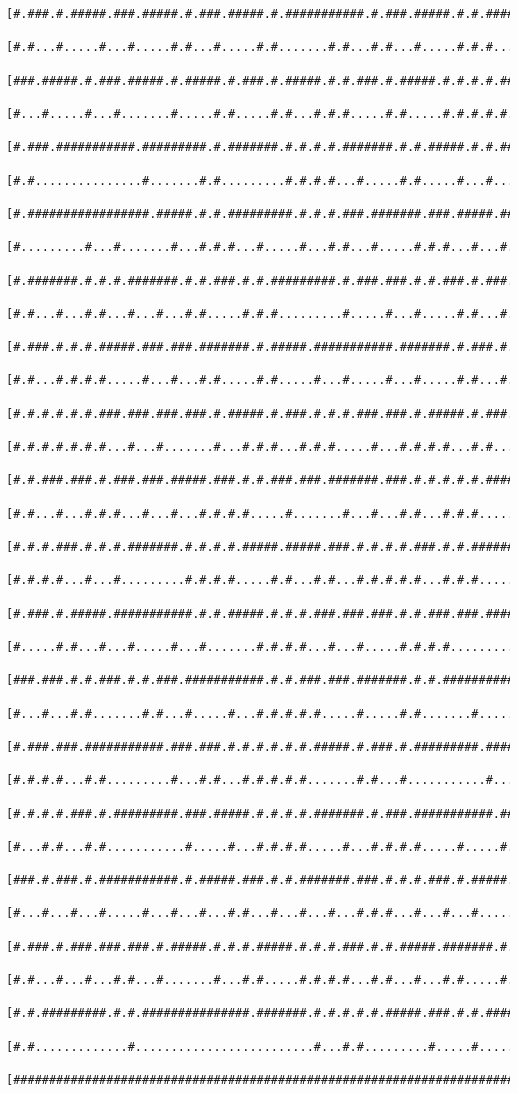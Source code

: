\documentclass[a4paper,10pt,ngerman]{scrartcl}
\begin{document}
\begin{lstlisting}[frame=tb]
 [#.###.#.#####.###.#####.#.###.#####.#.###########.#.###.#####.#.#.#####.###.#.###]
 [#.#...#.....#...#.....#.#...#.....#.#.......#.#...#.#...#.....#.#.#.....#...#...#]
 [###.#####.#.###.#####.#.#####.#.###.#.#####.#.#.###.#.#####.#.#.#.#.#####.#####.#]
 [#...#.....#...#.......#.....#.#.....#.#...#.#.#.....#.#.....#.#.#.#.#.........#.#]
 [#.###.###########.#########.#.#######.#.#.#.#.#######.#.#.#####.#.#.###########.#]
 [#.#...............#.......#.#.........#.#.#.#...#.....#.#.....#...#.............#]
 [#.#################.#####.#.#.#########.#.#.#.###.#######.###.#####.#############]
 [#.........#...#.......#...#.#.#...#.....#...#.#...#.....#.#.#...#...#.....#.....#]
 [#.#######.#.#.#.#######.#.#.###.#.#.#########.#.###.###.#.#.###.#.###.###.#####.#]
 [#.#...#...#.#...#...#...#.#.....#.#.#.........#.....#...#.....#.#...#.#.......#.#]
 [#.###.#.#.#.#####.###.###.#######.#.#####.###########.#######.#.###.#.#######.#.#]
 [#.#...#.#.#.#.....#...#...#.#.....#.#.....#...#.....#...#.....#.#...#.#.....#.#.#]
 [#.#.#.#.#.#.###.###.###.###.#.#####.#.###.#.#.#.###.###.#.#####.#.###.#.###.#.#.#]
 [#.#.#.#.#.#.#...#...#.......#...#.#.#...#.#.#.....#...#.#.#.#...#.#.....#...#.#.#]
 [#.#.###.###.#.###.###.#####.###.#.#.###.###.#######.###.#.#.#.#.#.#######.###.#.#]
 [#.#...#...#.#.#...#...#...#.#.#.#.....#.......#...#...#.#...#.#.#.........#.#...#]
 [#.#.#.###.#.#.#.#######.#.#.#.#.#####.#####.###.#.#.#.#.###.#.#.###########.###.#]
 [#.#.#.#...#...#.........#.#.#.#.....#.#...#.#...#.#.#.#.#...#.#.#...........#...#]
 [#.###.#.#####.###########.#.#.#####.#.#.#.###.###.###.#.#.###.###.#######.###.###]
 [#.....#.#...#...#.....#...#.......#.#.#.#...#...#.....#.#.#.#...........#.......#]
 [###.###.#.#.###.#.#.###.###########.#.#.###.###.#######.#.#.#####################]
 [#...#...#.#.......#.#...#.....#...#.#.#.#.#.....#.....#.#.......#...............#]
 [#.###.###.###########.###.###.#.#.#.#.#.#.#####.#.###.#.#########.#############.#]
 [#.#.#.#...#.#.........#...#.#...#.#.#.#.#.......#.#...#...........#.....#.....#.#]
 [#.#.#.#.###.#.#########.###.#####.#.#.#.#.#######.#.###.###########.###.#.###.#.#]
 [#...#.#...#.#...........#.....#...#.#.#.#.....#...#.#.#.#.....#.....#.#...#.#.#.#]
 [###.#.###.#.###########.#.#####.###.#.#.#######.###.#.#.#.###.#.#####.#####.#.#.#]
 [#...#...#...#.....#...#...#...#.#...#...#...#...#.#.#...#...#...#.....#...#...#.#]
 [#.###.#.###.###.###.#.#####.#.#.#.#####.#.#.#.###.#.#.#####.#######.#.#.#.#.###.#]
 [#.#...#...#...#.#...#.......#...#.#.....#.#.#.#...#.#...#...#.#.....#.#.#...#...#]
 [#.#.#########.#.#.###############.#######.#.#.#.#.#.#####.###.#.#.#####.#######.#]
 [#.#.............#.........................#...#.#.........#.....#...............#]
 [#################################################################################]]

\end{lstlisting}
\end{document}
